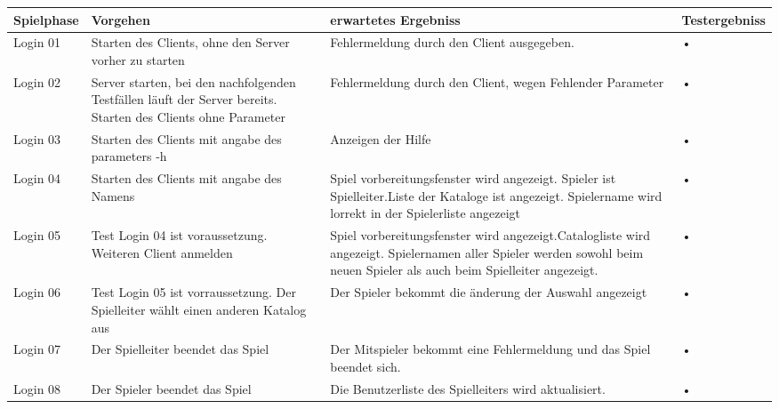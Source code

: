 \documentclass[a4paper,15pt]{article}
\begin{document}
\begin{tabular}{|l|p{5cm}|p{5cm}|l|}
\hline Spielphase & Vorgehen & erwartetes Ergebniss & Testergebniss \\ 
\hline Login 01 & Starten des Clients, ohne den Server vorher zu starten & Fehlermeldung durch den Client ausgegeben. & • \\ 
\hline Login  02 & Server starten, bei den nachfolgenden Testfällen läuft der Server bereits.  Starten des Clients ohne Parameter & Fehlermeldung durch den Client, wegen Fehlender Parameter & • \\ 
\hline Login  03 & Starten des Clients mit angabe des parameters -h & Anzeigen der Hilfe & • \\ 
\hline Login 04 &  Starten des Clients mit angabe des Namens & Spiel vorbereitungsfenster wird angezeigt. Spieler ist Spielleiter.Liste der Kataloge ist angezeigt. Spielername wird lorrekt in der Spielerliste angezeigt & • \\ 
\hline Login 05 & Test Login 04 ist voraussetzung. Weiteren Client anmelden & Spiel vorbereitungsfenster wird angezeigt.Catalogliste wird angezeigt. Spielernamen aller Spieler werden sowohl beim neuen Spieler als auch beim Spielleiter angezeigt. & • \\ 
\hline Login 06 & Test Login 05 ist vorraussetzung. Der Spielleiter wählt einen anderen Katalog aus & Der Spieler bekommt die änderung der Auswahl angezeigt & • \\ 
\hline Login 07 & Der Spielleiter beendet das Spiel & Der Mitspieler bekommt eine Fehlermeldung und das Spiel beendet sich. & • \\ 
\hline Login 08 & Der Spieler beendet das Spiel & Die Benutzerliste des Spielleiters wird aktualisiert. & • \\ 
\hline 
\end{tabular} 
\newpage
\end{document}
